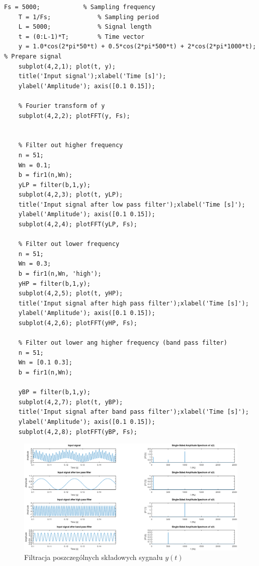 \begin{lstlisting}[caption=Filtracja sygnału poszczególnych składowych z sygnały $y(t)$ , label=lab3/lst/firFiltersExample]
	Fs = 5000;            % Sampling frequency
	T = 1/Fs;             % Sampling period       
	L = 5000;             % Signal length
	t = (0:L-1)*T;        % Time vector
	y = 1.0*cos(2*pi*50*t) + 0.5*cos(2*pi*500*t) + 2*cos(2*pi*1000*t); % Prepare signal
	subplot(4,2,1); plot(t, y); 
	title('Input signal');xlabel('Time [s]'); 
	ylabel('Amplitude'); axis([0.1 0.15]);
	
	% Fourier transform of y
	subplot(4,2,2); plotFFT(y, Fs);
	
	
	% Filter out higher frequency
	n = 51;
	Wn = 0.1;
	b = fir1(n,Wn);
	yLP = filter(b,1,y);
	subplot(4,2,3); plot(t, yLP);
	title('Input signal after low pass filter');xlabel('Time [s]'); 
	ylabel('Amplitude'); axis([0.1 0.15]);
	subplot(4,2,4); plotFFT(yLP, Fs);
	
	% Filter out lower frequency
	n = 51;
	Wn = 0.3;
	b = fir1(n,Wn, 'high');
	yHP = filter(b,1,y);
	subplot(4,2,5); plot(t, yHP);
	title('Input signal after high pass filter');xlabel('Time [s]'); 
	ylabel('Amplitude'); axis([0.1 0.15]);
	subplot(4,2,6); plotFFT(yHP, Fs);
	
	% Filter out lower ang higher frequency (band pass filter)
	n = 51;
	Wn = [0.1 0.3];
	b = fir1(n,Wn);
	
	yBP = filter(b,1,y);
	subplot(4,2,7); plot(t, yBP); 
	title('Input signal after band pass filter');xlabel('Time [s]'); 
	ylabel('Amplitude'); axis([0.1 0.15]);
	subplot(4,2,8); plotFFT(yBP, Fs);
\end{lstlisting}
\begin{figure}[hbt!]
	\centering
	\includegraphics[width=0.95\linewidth]{images/firFiltersExample.png}
	\caption{Filtracja poszczególnych składowych sygnału $y(t)$}
	\label{lab3/fig/firFiltersExample}
\end{figure}




